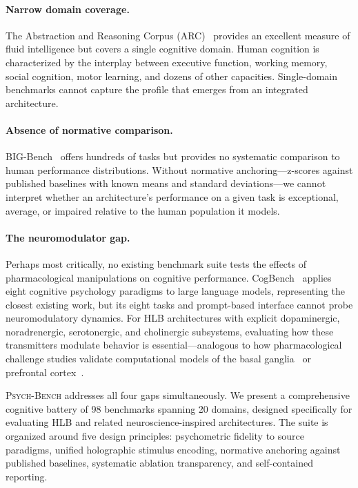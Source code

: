 \documentclass[11pt,letterpaper]{article}
\newcommand{\psychbench}{\textsc{Psych-Bench}}
\newcommand{\hlb}{\textsc{HLB}}
\begin{document}
\paragraph{Narrow domain coverage.} The Abstraction and Reasoning Corpus (ARC)~\citep{chollet2019measure} provides an excellent measure of fluid intelligence but covers a single cognitive domain. Human cognition is characterized by the interplay between executive function, working memory, social cognition, motor learning, and dozens of other capacities. Single-domain benchmarks cannot capture the profile that emerges from an integrated architecture.

\paragraph{Absence of normative comparison.} BIG-Bench~\citep{srivastava2023beyond} offers hundreds of tasks but provides no systematic comparison to human performance distributions. Without normative anchoring---z-scores against published baselines with known means and standard deviations---we cannot interpret whether an architecture's performance on a given task is exceptional, average, or impaired relative to the human population it models.

\paragraph{The neuromodulator gap.} Perhaps most critically, no existing benchmark suite tests the effects of pharmacological manipulations on cognitive performance. CogBench~\citep{codaforno2024cogbench} applies eight cognitive psychology paradigms to large language models, representing the closest existing work, but its eight tasks and prompt-based interface cannot probe neuromodulatory dynamics. For \hlb{} architectures with explicit dopaminergic, noradrenergic, serotonergic, and cholinergic subsystems, evaluating how these transmitters modulate behavior is essential---analogous to how pharmacological challenge studies validate computational models of the basal ganglia~\citep{doya2002metalearning} or prefrontal cortex~\citep{arnsten2011catecholamine}.

\psychbench{} addresses all four gaps simultaneously. We present a comprehensive cognitive battery of 98 benchmarks spanning 20 domains, designed specifically for evaluating \hlb{} and related neuroscience-inspired architectures. The suite is organized around five design principles: psychometric fidelity to source paradigms, unified holographic stimulus encoding, normative anchoring against published baselines, systematic ablation transparency, and self-contained reporting.
\end{document}
